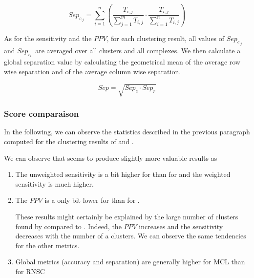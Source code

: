 \[Sep_{c_{.j}} = \sum_{i=1}^{n}{(\frac{T_{i,j}}{\sum_{j=1}^{m}{T_{i,j}}} \cdot \frac{T_{i,j}}{\sum_{i=1}^{n}{T_{i,j}}})}\]

As for the sensitivity and the $PPV$, for each clustering result, all values of $Sep_{c_{.j}}$ and $Sep_{r_{i.}}$ are averaged over all clusters and all complexes. We then calculate a global separation value by calculating the geometrical mean of the average row wise separation and of the average column wise separation.

\[Sep = \sqrt{Sep_c \cdot Sep_r}\]


\subsubsection{Score comparaison}

In the following, we can observe the statistics described in the previous paragraph computed for the clustering results of  and .

We can observe that  seems to produce slightly more valuable results as 
\begin{enumerate}
  \item The unweighted sensitivity is a bit higher for  than for  and the weighted sensitivity is much higher.
  \item The $PPV$ is a only bit lower for  than for .

These results might certainly be explained by the large number of clusters found by  compared to . Indeed, the $PPV$ increases and the sensitivity decreases with the number of a clusters.
We can observe the same tendencies for the other metrics.

\item Global metrics (accuracy and separation) are generally higher for MCL than for RNSC

\end{enumerate}

